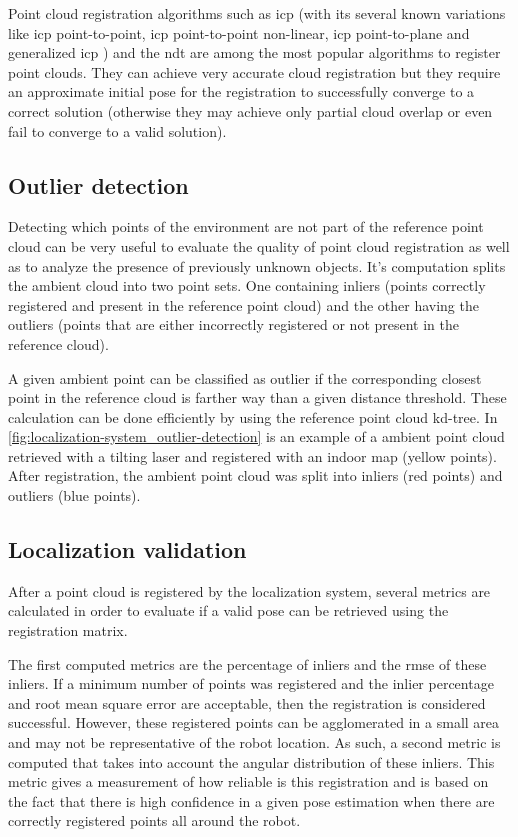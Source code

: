Point cloud registration algorithms such as \gls{icp} \cite{Besl1992} (with its several known variations \cite{Rusinkiewicz2001,Pomerleau2013} like \gls{icp} point-to-point, \gls{icp} point-to-point non-linear, \gls{icp} point-to-plane and generalized \gls{icp} \cite{Segal2009}) and the \gls{ndt} \cite{Magnusson2009} are among the most popular algorithms to register point clouds. They can achieve very accurate cloud registration but they require an approximate initial pose for the registration to successfully converge to a correct solution (otherwise they may achieve only partial cloud overlap or even fail to converge to a valid solution).


\subsection{Outlier detection}

Detecting which points of the environment are not part of the reference point cloud can be very useful to evaluate the quality of point cloud registration as well as to analyze the presence of previously unknown objects. It's computation splits the ambient cloud into two point sets. One containing inliers (points correctly registered and present in the reference point cloud) and the other having the outliers (points that are either incorrectly registered or not present in the reference cloud).

A given ambient point can be classified as outlier if the corresponding closest point in the reference cloud is farther way than a given distance threshold. These calculation can be done efficiently by using the reference point cloud kd-tree. In \cref{fig:localization-system_outlier-detection} is an example of a ambient point cloud retrieved with a tilting laser and registered with an indoor map (yellow points). After registration, the ambient point cloud was split into inliers (red points) and outliers (blue points).


\subsection{Localization validation}

After a point cloud is registered by the localization system, several metrics are calculated in order to evaluate if a valid pose can be retrieved using the registration matrix.

The first computed metrics are the percentage of inliers and the \gls{rmse} of these inliers. If a minimum number of points was registered and the inlier percentage and root mean square error are acceptable, then the registration is considered successful. However, these registered points can be agglomerated in a small area and may not be representative of the robot location. As such, a second metric is computed that takes into account the angular distribution of these inliers. This metric gives a measurement of how reliable is this registration and is based on the fact that there is high confidence in a given pose estimation when there are correctly registered points all around the robot.

